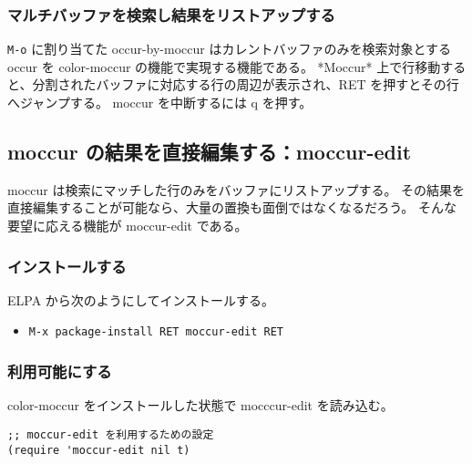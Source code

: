 \subsubsection{マルチバッファを検索し結果をリストアップする}
\texttt{M-o} に割り当てた occur-by-moccur はカレントバッファのみを検索対象とする occur を color-moccur の機能で実現する機能である。
*Moccur* 上で行移動すると、分割されたバッファに対応する行の周辺が表示され、RET を押すとその行へジャンプする。
moccur を中断するには q を押す。
\subsection{moccur の結果を直接編集する：moccur-edit}
moccur は検索にマッチした行のみをバッファにリストアップする。
その結果を直接編集することが可能なら、大量の置換も面倒ではなくなるだろう。
そんな要望に応える機能が moccur-edit である。
\subsubsection{インストールする}
ELPA から次のようにしてインストールする。
\begin{itemize}\setlength{\leftskip}{-1.00zw}%
\item[] \texttt{M-x package-install RET moccur-edit RET}
\end{itemize}
\subsubsection{利用可能にする}
color-moccur をインストールした状態で mocccur-edit を読み込む。
\begin{mdframed}[roundcorner=0.50zw,leftmargin=3.00zw,rightmargin=3.00zw,skipabove=0.40zw,skipbelow=0.40zw,innertopmargin=4.00pt,innerbottommargin=4.00pt,innerleftmargin=5.00pt,innerrightmargin=5.00pt,linecolor=gray!020,linewidth=0.50pt,backgroundcolor=gray!20]
\begin{verbatim}
;; moccur-edit を利用するための設定
(require 'moccur-edit nil t)
\end{verbatim}
\end{mdframed}
